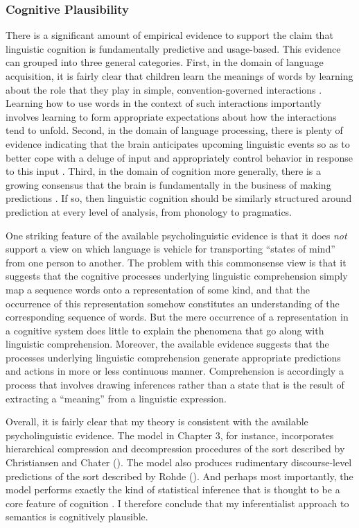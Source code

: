 \subsubsection{Cognitive Plausibility}

There is a significant amount of empirical evidence to support the claim that linguistic cognition is fundamentally predictive and usage-based. This evidence can grouped into three general categories. First, in the domain of language acquisition, it is fairly clear that children learn the meanings of words by learning about the role that they play in simple, convention-governed interactions \citep{Tomasello:2005,Tomasello:2001}. Learning how to use words in the context of such interactions importantly involves learning to form appropriate expectations about how the interactions tend to unfold. Second, in the domain of language processing, there is plenty of evidence indicating that the brain anticipates upcoming linguistic events so as to better cope with a deluge of input and appropriately control behavior in response to this input \citep{Christiansen:2015,Pickering:2007,Pickering:2013}. Third, in the domain of cognition more generally, there is a growing consensus that the brain is fundamentally in the business of making predictions \citep{clark:2013}. If so, then linguistic cognition should be similarly structured around prediction at every level of analysis, from phonology to pragmatics. 

One striking feature of the available psycholinguistic evidence is that it does \textit{not} support a view on which language is vehicle for transporting ``states of mind'' from one person to another. The problem with this commonsense view is that it suggests that the cognitive processes underlying linguistic comprehension simply map a sequence words onto a representation of some kind, and that the occurrence of this representation somehow constitutes an understanding of the corresponding sequence of words. But the mere occurrence of a representation in a cognitive system does little to explain the phenomena that go along with linguistic comprehension. Moreover, the available evidence suggests that the processes underlying linguistic comprehension generate appropriate predictions and actions in more or less continuous manner. Comprehension is accordingly a process that involves drawing inferences rather than a state that is the result of extracting a ``meaning'' from a linguistic expression.

Overall, it is fairly clear that my theory is consistent with the available psycholinguistic evidence. The model in Chapter 3, for instance, incorporates hierarchical compression and decompression procedures of the sort described by Christiansen and Chater (\citeyear{Christiansen:2015}). The model also produces rudimentary discourse-level predictions of the sort described by Rohde (\citeyear{Rohde:2008}). And perhaps most importantly, the model performs exactly the kind of statistical inference that is thought to be a core feature of cognition \citep{Eliasmith:2007,clark:2013}. I therefore conclude that my inferentialist approach to semantics is cognitively plausible.  

